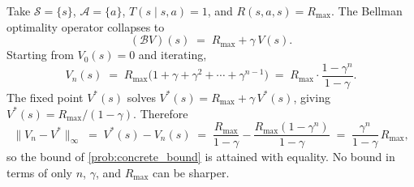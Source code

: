 \documentclass[11pt]{article}
\newcommand{\cS}{\mathcal{S}}
\newcommand{\cA}{\mathcal{A}}
\begin{document}
\begin{solution}
Take $\cS = \{s\}$, $\cA = \{a\}$, $T(s \mid s, a) = 1$, and $R(s, a, s) = R_{\max}$. The Bellman optimality operator collapses to
$$
(\mathcal{B} V)(s) \;=\; R_{\max} + \gamma\, V(s).
$$
Starting from $V_0(s) = 0$ and iterating,
$$
V_n(s) \;=\; R_{\max}\bigl(1 + \gamma + \gamma^2 + \cdots + \gamma^{n-1}\bigr) \;=\; R_{\max} \cdot \frac{1 - \gamma^n}{1 - \gamma}.
$$
The fixed point $V^*(s)$ solves $V^*(s) = R_{\max} + \gamma\, V^*(s)$, giving $V^*(s) = R_{\max}/(1-\gamma)$. Therefore
$$
\|V_n - V^*\|_\infty \;=\; V^*(s) - V_n(s) \;=\; \frac{R_{\max}}{1-\gamma} - \frac{R_{\max}(1 - \gamma^n)}{1-\gamma} \;=\; \frac{\gamma^n}{1-\gamma}\, R_{\max},
$$
so the bound of \cref{prob:concrete_bound} is attained with equality. No bound in terms of only $n$, $\gamma$, and $R_{\max}$ can be sharper.
\end{solution}



\end{document}
